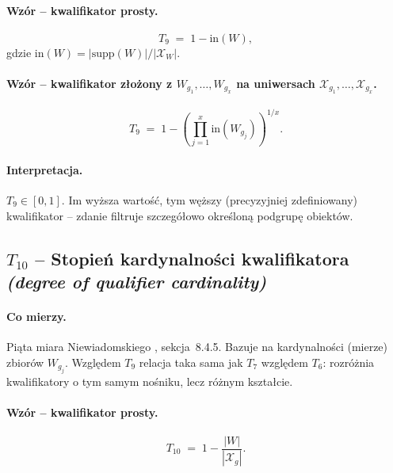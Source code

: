 \paragraph{Wzór -- kwalifikator prosty.}
\begin{equation}
\label{eq:T9-single}
    T_9 \;=\; 1 - \mathrm{in}(W),
\end{equation}
gdzie $\mathrm{in}(W) = |\mathrm{supp}(W)|/|\mathcal{X}_W|$.

\paragraph{Wzór -- kwalifikator złożony z $W_{g_1}, \ldots, W_{g_x}$
na uniwersach $\mathcal{X}_{g_1}, \ldots, \mathcal{X}_{g_x}$.}
\begin{equation}
\label{eq:T9-multi}
    T_9 \;=\; 1 - \left( \prod_{j=1}^{x} \mathrm{in}(W_{g_j}) \right)^{1/x}.
\end{equation}

\paragraph{Interpretacja.}
$T_9 \in [0, 1]$. Im wyższa wartość, tym węższy (precyzyjniej
zdefiniowany) kwalifikator -- zdanie filtruje szczegółowo określoną
podgrupę obiektów.

\subsection*{$T_{10}$ -- Stopień kardynalności kwalifikatora \\
\textit{(degree of qualifier cardinality)}}

\paragraph{Co mierzy.}
Piąta miara Niewiadomskiego \cite{niewiadomski2008}, sekcja~8.4.5.
Bazuje na kardynalności (mierze) zbiorów $W_{g_j}$. Względem $T_9$
relacja taka sama jak $T_7$ względem $T_6$: rozróżnia kwalifikatory
o tym samym nośniku, lecz różnym kształcie.

\paragraph{Wzór -- kwalifikator prosty.}
\begin{equation}
\label{eq:T10-single}
    T_{10} \;=\; 1 - \frac{|W|}{|\mathcal{X}_g|}.
\end{equation}

